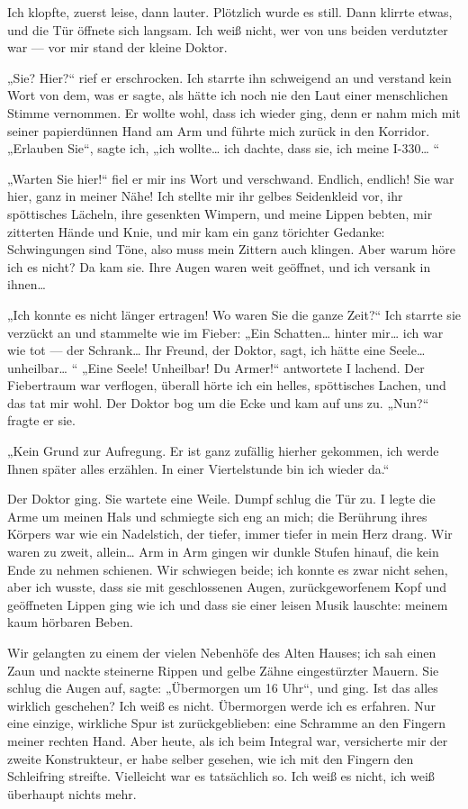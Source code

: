 Ich klopfte, zuerst leise, dann lauter. Plötzlich wurde es still.
Dann klirrte etwas, und die Tür öffnete sich langsam. Ich weiß
nicht, wer von uns beiden verdutzter war — vor mir stand der kleine
Doktor.

„Sie? Hier?“ rief er erschrocken. Ich starrte ihn schweigend an und
verstand kein Wort von dem, was er sagte, als hätte ich noch nie
den Laut einer menschlichen Stimme vernommen. Er wollte wohl, dass
ich wieder ging, denn er nahm mich mit seiner papierdünnen Hand am
Arm und führte mich zurück in den Korridor. „Erlauben Sie“, sagte
ich, „ich wollte\ldots{} ich dachte, dass sie, ich meine I-330\ldots{} “

„Warten Sie hier!“ fiel er mir ins Wort und verschwand. Endlich,
endlich! Sie war hier, ganz in meiner Nähe! Ich stellte mir ihr
gelbes Seidenkleid vor, ihr spöttisches Lächeln, ihre gesenkten
Wimpern, und meine Lippen bebten, mir zitterten Hände und Knie, und
mir kam ein ganz törichter Gedanke: Schwingungen sind Töne, also
muss mein Zittern auch klingen. Aber warum höre ich es nicht? Da
kam sie. Ihre Augen waren weit geöffnet, und ich versank in
ihnen\ldots{}

„Ich konnte es nicht länger ertragen! Wo waren Sie die ganze Zeit?“
Ich starrte sie verzückt an und stammelte wie im Fieber: „Ein
Schatten\ldots{} hinter mir\ldots{} ich war wie tot — der Schrank\ldots{} Ihr
Freund, der Doktor, sagt, ich hätte eine Seele\ldots{} unheilbar\ldots{} “
„Eine Seele! Unheilbar! Du Armer!“ antwortete I lachend. Der
Fiebertraum war verflogen, überall hörte ich ein helles,
spöttisches Lachen, und das tat mir wohl. Der Doktor bog um die
Ecke und kam auf uns zu. „Nun?“ fragte er sie.

„Kein Grund zur Aufregung. Er ist ganz zufällig hierher gekommen,
ich werde Ihnen später alles erzählen. In einer Viertelstunde bin
ich wieder da.“

Der Doktor ging. Sie wartete eine Weile. Dumpf schlug die Tür zu. I
legte die Arme um meinen Hals und schmiegte sich eng an mich; die
Berührung ihres Körpers war wie ein Nadelstich, der tiefer, immer
tiefer in mein Herz drang. Wir waren zu zweit, allein\ldots{} Arm in Arm
gingen wir dunkle Stufen hinauf, die kein Ende zu nehmen schienen.
Wir schwiegen beide; ich konnte es zwar nicht sehen, aber ich
wusste, dass sie mit geschlossenen Augen, zurückgeworfenem Kopf und
geöffneten Lippen ging wie ich und dass sie einer leisen Musik
lauschte: meinem kaum hörbaren Beben.

Wir gelangten zu einem der vielen Nebenhöfe des Alten Hauses; ich
sah einen Zaun und nackte steinerne Rippen und gelbe Zähne
eingestürzter Mauern. Sie schlug die Augen auf, sagte: „Übermorgen
um 16 Uhr“, und ging. Ist das alles wirklich geschehen? Ich weiß es
nicht. Übermorgen werde ich es erfahren. Nur eine einzige,
wirkliche Spur ist zurückgeblieben: eine Schramme an den Fingern
meiner rechten Hand. Aber heute, als ich beim Integral war,
versicherte mir der zweite Konstrukteur, er habe selber gesehen,
wie ich mit den Fingern den Schleifring streifte. Vielleicht war es
tatsächlich so. Ich weiß es nicht, ich weiß überhaupt nichts mehr.

